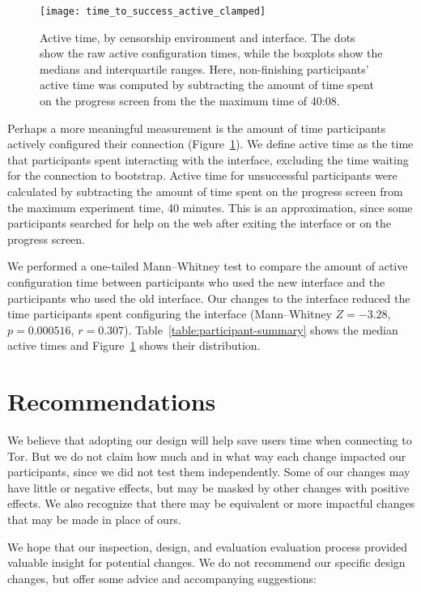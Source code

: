 \documentclass[USenglish,oneside,twocolumn]{article}
\begin{document}
{\begin{figure}[t]
\centering
\texttt{[image: time\_to\_success\_active\_clamped]}
\caption{
Active time, by censorship environment and interface.
The dots show the raw active configuration times,
while the boxplots show the medians and interquartile ranges.
Here, non-finishing participants' active time was computed by
subtracting the amount of time spent on the progress screen from the 
the maximum time of 40:08.
}
\label{fig:time_to_success_active_clamped}
\end{figure}

Perhaps a more meaningful measurement is the amount of time participants actively configured their connection (Figure~\ref{fig:time_to_success_active_clamped}). We define active time as the time that participants spent interacting with the interface, excluding the time waiting for the connection to bootstrap. Active time for unsuccessful participants were calculated by subtracting the amount of time spent on the progress screen from the maximum experiment time, 40 minutes. This is an approximation, since some participants searched for help on the web after exiting the interface or on the progress screen. 

We performed a one-tailed Mann--Whitney test to compare the amount of active configuration time between participants who used the new interface and the participants who used the old interface. Our changes to the interface reduced the time participants spent configuring the interface (Mann--Whitney $Z = -3.28$, $p = 0.000516$, $r = 0.307$).  Table~\ref{table:participant-summary} shows the median active times and Figure~\ref{fig:time_to_success_active_clamped} shows their distribution.
}

\section{Recommendations}
\label{recommendations}
We believe that adopting our design will help save users time when connecting to Tor. But we do not claim how much and in what way each change impacted our participants, since we did not test them independently. Some of our changes may have little or negative effects, but may be masked by other changes with positive effects. We also recognize that there may be equivalent or more impactful changes that may be made in place of ours. 

We hope that our inspection, design, and evaluation evaluation process provided valuable insight for potential changes. We do not recommend our specific design changes, but offer some advice and accompanying suggestions: \\
\end{document}
